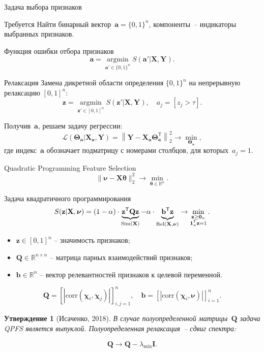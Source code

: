 \documentclass[9pt]{beamer}
\newcommand{\bz}{\mathbf{z}}
\newcommand{\ba}{\mathbf{a}}
\newcommand{\bb}{\mathbf{b}}
\newcommand{\bY}{\mathbf{Y}}
\newcommand{\bX}{\mathbf{X}}
\newcommand{\bQ}{\mathbf{Q}}
\newcommand{\bbR}{\mathbb{R}}
\newcommand{\bchi}{\boldsymbol{\chi}}
\newcommand{\bnu}{\boldsymbol{\nu}}
\newcommand{\bOne}{\boldsymbol{1}}
\newcommand{\bZero}{\boldsymbol{0}}
\newcommand{\btheta}{\boldsymbol{\theta}}
\newcommand{\bTheta}{\boldsymbol{\Theta}}
\newcommand{\argmin}{\mathop{\arg \min}\limits}
\newcommand{\T}{\mathsf{T}}
\newtheorem{statement}{Утверждение}
\begin{document}
\begin{frame}{Задача выбора признаков}
\begin{block}{Требуется}
Найти бинарный вектор~$\ba = \{0, 1\}^n$, компоненты~-- индикаторы выбранных признаков. 
\end{block}
\begin{block}{Функция ошибки отбора признаков}
	\vspace{-0.2cm}
\[
\ba = \argmin_{\ba' \in \{0, 1\}^n} S(\ba' | \bX, \bY).
\]
\vspace{-0.5cm}
\end{block}
\begin{block}{Релаксация}
	Замена дикретной области определения $\{0, 1\}^n$ на непрерывную релаксацию $[0, 1]^n$:
	\[
	\bz = \argmin_{\bz' \in [0, 1]^n} S(\bz' | \bX, \bY), \quad 
	a_j = [z_j > \tau].
\]
\end{block}
Получив~$\ba$, решаем задачу регрессии:
\[
\mathcal{L}(\bTheta_{\ba} | \bX_{\ba}, \bY) = {\left\| \mathbf{Y} - \bX_{\ba}\bTheta^{\T}_{\ba} \right\| }_2^2 \rightarrow\min_{\bTheta_{\ba}},
\]
где индекс~$\ba$ обозначает подматрицу с номерами столбцов, для которых~$a_j = 1$.
\end{frame}
\begin{frame}{Quadratic Programming Feature Selection}
	\[
	\| \bnu - \bX \btheta\|_2^2 \rightarrow\min_{\btheta \in \bbR^{n}}.
	\]
	\vspace{-0.3cm}
	\begin{block}{Задача квадратичного программирования}
	\vspace{-0.3cm}
	\[
	S(\bz | \bX, \bnu)	= (1 - \alpha) \cdot \underbrace{\bz^{\T} \bQ \bz}_{\text{Sim}(\bX)} - \alpha \cdot \underbrace{\vphantom{()} \mathbf{b}^{\T} \bz}_{\text{Rel}(\bX, \bnu)} \rightarrow \min_{\substack{\bz \geq \bZero_n \\ \bOne_n^{\T} \bz=1}}.
	\]
	\end{block}
		\begin{itemize}
			\item $\bz \in [0, 1]^n$ -- значимость признаков;
			\item $\bQ \in \bbR^{n \times n}$ -- матрица парных взаимодействий признаков;
			\item $\mathbf{b} \in \bbR^n$ -- вектор релевантностей признаков к целевой переменной.
		\end{itemize}
		\[
		\bQ = \left[\left|\text{corr}(\bchi_i, \bchi_j)\right|\right]_{i,j=1}^n, \quad
		\bb = \left[\left|\text{corr}(\bchi_i, \bnu)\right|\right]_{i=1}^n.
		\]
\vspace{-0.2cm}
\begin{statement}[Исаченко, 2018]
	В случае полуопределенной матрицы~$\bQ$ задача QPFS является выпуклой. 
	Полуопределенная релаксация~-- сдвиг спектра:
\end{statement}
\begin{equation*}
\bQ \rightarrow \bQ - \lambda_{\min} \mathbf{I}.
\end{equation*}
\end{frame}
\end{document}
